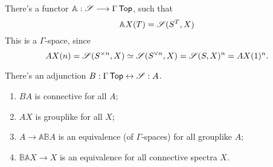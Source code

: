\documentclass[11pt]{article}
\begin{document}
\begin{JandrGammaSpaces}
There's a functor $\mathbb{A}:\mathscr{S}\longrightarrow\Gamma\operatorname{{\mathsf{Top}}}$, such that
\[\mathbb{A}X(T)=\mathscr{S}(S^T,X)\]
This is a $\Gamma$-space, since
\[AX(n)=\mathscr{S}(S^{\times n},X)\simeq \mathscr{S}(S^{\vee n},X)=\mathscr{S}(S,X)^n=AX(1)^n.\]
\begin{thm*}
There's an adjunction $B:\Gamma\operatorname{{\mathsf{Top}}}\leftrightarrow \mathscr{S}:A$.
\begin{enumerate}\squishlist
\item $BA$ is connective for all $A$;
\item $AX$ is grouplike for all $X$;
\item $A\to \mathbb{A}\mathbb{B}A$ is an equivalence (of $\Gamma$-spaces) for all grouplike $A$;
\item$\mathbb{B}\mathbb{A}X\to X$ is an equivalence for all connective spectra $X$.
\end{enumerate}
\end{thm*}


\pagebreak
\end{JandrGammaSpaces}
\end{document}
